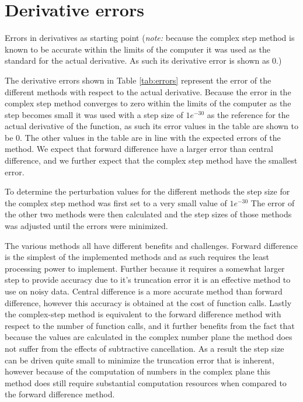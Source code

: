 \documentclass{article}
\begin{document}
\section{Derivative errors}
\begin{table}[H]
	\begin{center}
	\caption{Errors in derivatives as starting point (\textit{note:}
  because the complex step method is known to be accurate within the limits of
  the computer it was used as the standard for the actual derivative. As such
  its derivative error is shown as 0.)
	}
	\label{tab:errors}
	\noindent{}
	\end{center}
\end{table}
The derivative errors shown in Table \ref{tab:errors} represent the error of the different methods with respect to the actual derivative.
 Because the error in the complex step method converges to zero within the limits
 of the computer as the step becomes small it was used with a step size of $1e^{-30}$ as the reference for the actual derivative of the function,
 as such its error values in the table are shown to be 0.
 The other values in the table are in line with the expected errors of the method.
 We expect that forward difference have a larger error than central difference,
 and we further expect that the complex step method have the smallest error.

To determine the perturbation values for the different methods the step size
for the complex step method was first set to a very small value of $1e^{-30}$
The error of the other two methods were then calculated and the step sizes of
those methods was adjusted until the errors were minimized.

The various methods all have different benefits and challenges.
Forward difference is the simplest of the implemented methods and as such requires the least processing power to implement.
Further because it requires a somewhat larger step to provide accuracy due to it's truncation error it is an effective method to use on noisy data.
Central difference is a more accurate method than forward difference, however this accuracy is obtained at the cost of function calls.
Lastly the complex-step method is equivalent to the forward difference method with respect to the number of function calls,
and it further benefits from the fact that because the values are calculated in the complex number plane the method does not suffer from the effects of subtractive cancellation.
As a result the step size can be driven quite small to minimize the truncation error that is inherent,
however because of the computation of numbers in the complex plane this method does still require substantial computation resources when compared to the forward difference method.
\end{document}
